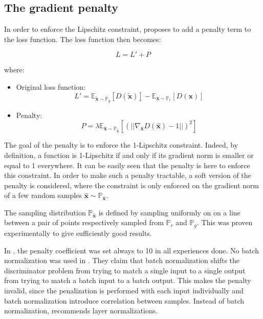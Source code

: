 \documentclass[11pt,a4paper,twoside]{report}
\begin{document}
\subsection{The gradient penalty}

In order to enforce the Lipschitz constraint, \cite{DBLP:journals/corr/GulrajaniAADC17} proposes to add a penalty term to the loss function. The loss function then becomes: 

\begin{equation}
    L = L' + P
\end{equation}

where:

\begin{itemize}
    \item Original loss function: 
    \begin{equation}
        L' = \mathbb{E}_{\mathbf{\tilde{x}} \sim \mathbb{P}_g} [D(\mathbf{\tilde{x}})] - \mathbb{E}_{\mathbf{x} \sim \mathbb{P}_r} [D(\mathbf{x})]
    \end{equation}
    \item Penalty:
    \begin{equation}
        P = \lambda \mathbb{E}_{\hat{\mathbf{x}} \sim \mathbb{P}_{\hat{\mathbf{x}}}}[(||\nabla_{\hat{\mathbf{x}}} D(\hat{\mathbf{x}})-1||)^2]
    \end{equation}
\end{itemize}

The goal of the penalty is to enforce the 1-Lipschitz constraint. Indeed, by definition, a function is 1-Lipschitz if and only if its gradient norm is smaller or equal to 1 everywhere. It can be easily seen that the penalty is here to enforce this constraint. In order to make such a penalty tractable, a soft version of the penalty is considered, where the constraint is only enforced on the gradient norm of a few random samples $\hat{\mathbf{x}} \sim \mathbb{P}_{\hat{\mathbf{x}}}$.

The sampling distribution $\mathbb{P}_{\hat{\mathbf{x}}}$ is defined by sampling uniformly on on a line between a pair of points respectively sampled from $\mathbb{P}_{r}$ and $\mathbb{P}_{g}$. This was proven experimentally to give sufficiently good results.

In \cite{DBLP:journals/corr/GulrajaniAADC17}, the penalty coefficient was set always to 10 in all experiences done. No batch normalization was used in \cite{DBLP:journals/corr/GulrajaniAADC17}. They claim that batch normalization shifts the discriminator problem from trying to match a single input to a single output from trying to match a batch input to a batch output. This makes the penalty invalid, since the penalization is performed with each input individually and batch normalization introduce correlation between samples. Instead of batch normalization, \cite{DBLP:journals/corr/GulrajaniAADC17} recommends layer normalizations.
\end{document}
